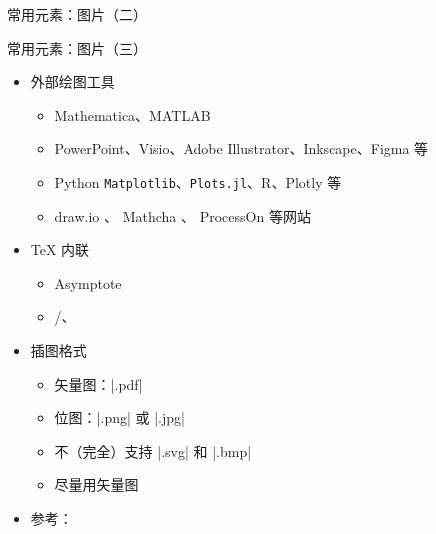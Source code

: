 \begin{frame}[fragile]{常用元素：图片（二）}
\end{frame}

\begin{frame}[fragile]{常用元素：图片（三）}
  \begin{itemize}
    \item 外部绘图工具
          \begin{itemize}
            \item Mathematica、MATLAB
            \item PowerPoint、Visio、Adobe Illustrator、Inkscape、Figma 等
            \item Python \texttt{Matplotlib}、\texttt{Plots.jl}、R、Plotly 等
            \item draw.io 、
                  Mathcha 、
                  ProcessOn  等网站
          \end{itemize}
    \item \TeX{} 内联
          \begin{itemize}
            \item Asymptote
            \item \alert{/、}
          \end{itemize}
    \item 插图格式
          \begin{itemize}
            \item 矢量图：|.pdf|%
            \item 位图：|.png| 或 |.jpg|
            \item 不（完全）支持 |.svg| 和 |.bmp|
            \item \alert{尽量用矢量图}
          \end{itemize}
    \item 参考：
  \end{itemize}
\end{frame}

